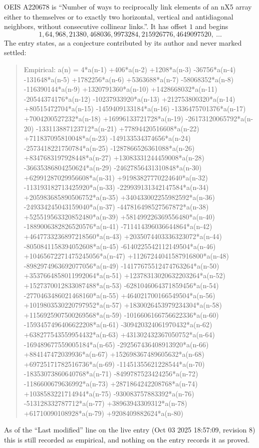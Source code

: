 \documentclass[11pt,a4paper]{article}
\theoremstyle{plain}
\theoremstyle{definition}
\begin{document}
OEIS A220678 is ``Number of ways to reciprocally link elements of an nX5 array either to themselves or to exactly two horizontal, vertical and antidiagonal neighbors, without consecutive collinear links.''. It has offset $1$ and begins
\[
1, 64, 968, 21380, 468036, 9973284, 215926776, 4649097520,\ \dots
\]
The entry states, as a conjecture contributed by its author and never marked settled:
\begin{quote}
Empirical: a(n) = 4*a(n-1) +406*a(n-2) +1208*a(n-3) -36756*a(n-4) -131648*a(n-5) +1782256*a(n-6) +5363688*a(n-7) -58068352*a(n-8) -116390144*a(n-9) +1320791360*a(n-10) +1428668032*a(n-11) -20544374176*a(n-12) -10237933920*a(n-13) +212753800320*a(n-14) +80515472704*a(n-15) -1459409133184*a(n-16) -1336475701376*a(n-17) +7004200527232*a(n-18) +16996133721728*a(n-19) -26173120065792*a(n-20) -133113887123712*a(n-21) +77894420516608*a(n-22) +711837095810048*a(n-23) -149133534374656*a(n-24) -2573418221750784*a(n-25) -1287866526361088*a(n-26) +8347683197928448*a(n-27) +13083331244459008*a(n-28) -36635386804250624*a(n-29) -24627856431310848*a(n-30) +62991287029956608*a(n-31) +91983827770224640*a(n-32) -113193182713425920*a(n-33) -229939131342147584*a(n-34) +205983685890506752*a(n-35) +340433002255982592*a(n-36) -249334245043159040*a(n-37) -447816498527567872*a(n-38) +525519563320852480*a(n-39) +581499226369556480*a(n-40) -1889006382826520576*a(n-41) -711414396036644864*a(n-42) +4647733236897218560*a(n-43) +2035074403336323072*a(n-44) -8050841158394052608*a(n-45) -6140225542112149504*a(n-46) +10465672271475245056*a(n-47) +11267244041587916800*a(n-48) -8982974963692077056*a(n-49) -14177675512474763264*a(n-50) +3537664858011992064*a(n-51) +12378313020632203264*a(n-52) +1527370012833087488*a(n-53) -6281046064371859456*a(n-54) -2770463486021468160*a(n-55) +464021700166549504*a(n-56) +1019803530220797952*a(n-57) +1830026453979234304*a(n-58) +1156925907500269568*a(n-59) -1016606166756622336*a(n-60) -1593457496406622208*a(n-61) -309420324061970432*a(n-62) +638277543559954432*a(n-63) +431302432367050752*a(n-64) -169489677559005184*a(n-65) -292567436408913920*a(n-66) +884147472039936*a(n-67) +152698367489605632*a(n-68) +69725171782516736*a(n-69) -11451355621228544*a(n-70) -18353073860640768*a(n-71) -8499787523424256*a(n-72) -1186600679636992*a(n-73) +2871864242208768*a(n-74) +1038583221714944*a(n-75) -930083757883392*a(n-76) -513128332787712*a(n-77) +38963943309312*a(n-78) +61710090108928*a(n-79) +9208409882624*a(n-80)
\end{quote}
As of the ``Last modified'' line on the live entry (Oct 03 2025 18:57:09, revision 8) this is still
recorded as empirical, and nothing on the entry records it as proved.
\end{document}
